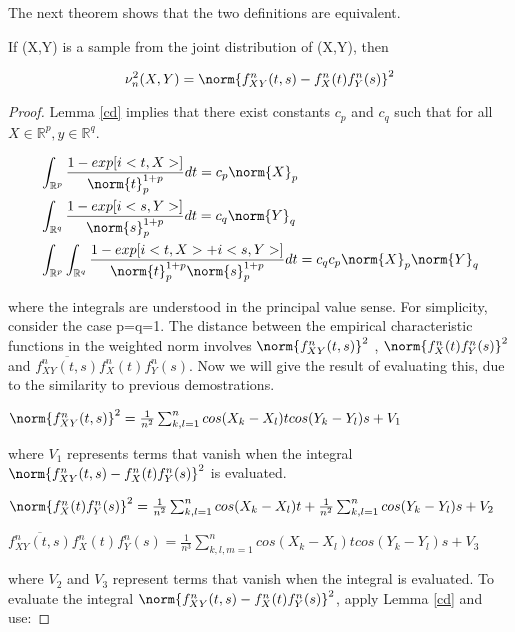 The next theorem shows that the two definitions are equivalent.

\begin{thm}
If (X,Y) is a sample from the joint distribution of (X,Y), then

$$
\nu_{n}^{2}(X,Y) = \norm{f_{XY}^{n}(t,s) - f_{X}^{n}(t)f_{Y}^{n}(s)}^{2}
$$
\end{thm}

\begin{proof}
Lemma \ref{cd} implies that there exist constants $c_{p}$ and $c_{q}$ such that for all $X\in \mathbb{R}^{p}, y\in \mathbb{R}^{q}$.

\begin{equation}{}
\begin{split}
&\int_{\mathbb{R}^{p}}\frac{1- exp[i<t,X>]}{\norm{t}_{p}^{1+p}}dt = c_p\norm{X}_{p} \\
&\int_{\mathbb{R}^{q}}\frac{1- exp[i<s,Y>]}{\norm{s}_{p}^{1+p}}dt = c_q\norm{Y}_{q} \\
&\int_{\mathbb{R}^{p}}\int_{\mathbb{R}^{q}}\frac{1- exp[i<t,X>+i<s,Y>]}{\norm{t}_{p}^{1+p}\norm{s}_{p}^{1+p}}dt = c_{q}c_{p}\norm{X}_{p}\norm{Y}_{q}
\end{split}
\end{equation}

where the integrals are understood in the principal value sense. For simplicity, consider the case p=q=1. The distance between the empirical characteristic functions in the weighted norm involves $\norm{f_{XY}^{n}(t,s)}^{2}$ , $\norm{f_{X}^{n}(t)f_{Y}^{n}(s)}^{2}$ and $\overline{f_{XY}^{n}(t,s)}f_{X}^{n}(t)f_{Y}^{n}(s)$.
Now we will give the result of evaluating this, due to the similarity to previous demostrations.

$\norm{f_{XY}^{n}(t,s)}^{2} = \frac{1}{n^{2}}\sum_{k,l=1}^{n} cos(X_{k}-X_{l})tcos(Y_{k}-Y_{l})s + V_{1}$

where $V_{1}$ represents terms that vanish when the integral $\norm{f_{XY}^{n}(t,s) - f_{X}^{n}(t)f_{Y}^{n}(s)}^{2}$ is evaluated.

$\norm{f_{X}^{n}(t)f_{Y}^{n}(s)}^{2} = \frac{1}{n^{2}}\sum_{k,l=1}^{n} cos(X_{k}-X_{l})t+ \frac{1}{n^{2}}\sum_{k,l=1}^{n}cos(Y_{k}-Y_{l})s + V_{2}$

$\overline{f_{XY}^{n}(t,s)}f_{X}^{n}(t)f_{Y}^{n}(s) = \frac{1}{n^{3}}\sum_{k,l,m=1}^{n} cos(X_{k}-X_{l})tcos(Y_{k}-Y_{l})s + V_{3}$


where $V_{2}$ and $V_{3}$ represent terms that vanish when the integral is evaluated. To evaluate the integral $\norm{f_{XY}^{n}(t,s) - f_{X}^{n}(t)f_{Y}^{n}(s)}^{2}$, apply Lemma \ref{cd} and use:


\end{proof}
